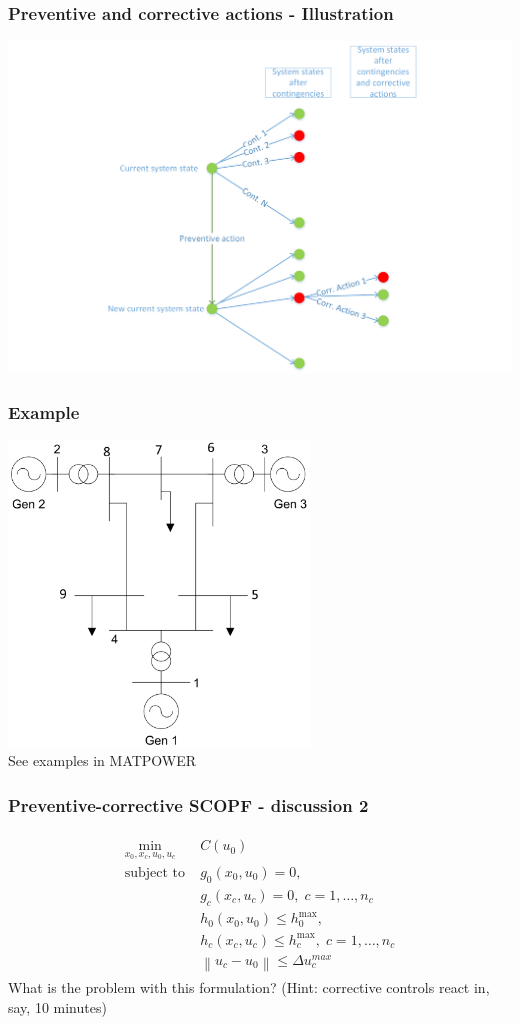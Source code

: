 \documentclass[compress]{beamer}
\newcommand\norm[1]{\left\lVert#1\right\rVert}
\begin{document}
\begin{frame}
  \frametitle{Preventive and corrective actions - Illustration}
\includegraphics[width=\textwidth]{Figs/Event-tree-prev-corr-actions.png}
\end{frame}

\begin{frame}
  \frametitle{Example}
\includegraphics[width=0.6\textwidth]{Figs/ieee9.png}\\
See examples in MATPOWER  
\end{frame}

\begin{frame}
  \frametitle{Preventive-corrective SCOPF - discussion 2}
  \begin{align}
  \tag{PC-SCOPF}
    \begin{split}
    \min_{x_0,x_c,u_0,u_c} \; & C(u_0) \\
    \text{subject to} \; & g_0(x_0,u_0) = 0, \; \\
    & g_c(x_c,u_c) = 0, \; c = 1,\ldots,n_c \\
    & h_0(x_0,u_0) \leq h_0^{\text{max}}, \\
    & h_c(x_c,u_c) \leq h_c^{\text{max}}, \; c = 1,\ldots,n_c \\
    & \norm{u_c - u_0} \leq \Delta u_c^{max}
    \end{split}
  \end{align}
What is the problem with this formulation? (Hint: corrective controls react in, say, 10 minutes)
\end{frame}
\end{document}
